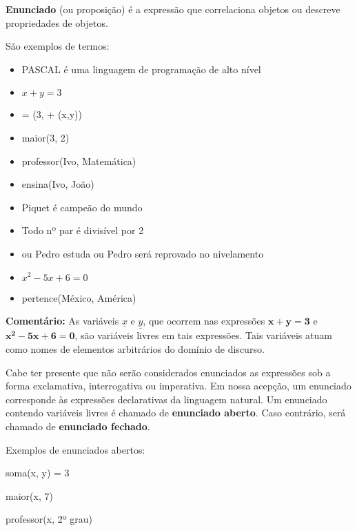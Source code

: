 \documentclass[
	14pt,				%
	twoside,			%
	a4paper,			%
	english,			%
	french,				%
	spanish,			%
	brazil,				%
    ]{abntex2}
\begin{document}
\vskip 0.5cm

\begin{addmargin}[2.0cm]{0cm}
\textbf{Enunciado} (ou proposição) é a expressão que correlaciona objetos ou descreve propriedades de objetos.
\end{addmargin}

\vskip 0.5cm

\noindent São exemplos de termos:

\begin{itemize}[itemsep=0.01pt]
\renewcommand\labelitemi{\textbf{-}}
    \item PASCAL é uma linguagem de programação de alto nível
    \item $x + y = 3$
    \item  = (3, + (x,y))
    \item  maior(3, 2)
    \item professor(Ivo, Matemática)
    \item ensina(Ivo, João)
    \item Piquet é campeão do mundo
    \item Todo nº par é divisível por 2
    \item ou Pedro estuda ou Pedro será reprovado no nivelamento
    \item $x^2 - 5x + 6 = 0$
    \item pertence(México, América)
\end{itemize}

\textbf{Comentário:} As variáveis $\underline{x}$ e $\underline{y}$, que ocorrem nas expressões $\bm{x + y = 3}$ e $\bm{x^2 - 5x + 6 = 0}$, são variáveis livres em tais expressões.
Tais variáveis atuam como nomes de elementos arbitrários do domínio de discurso.

\noindent
Cabe ter presente que não serão considerados enunciados as expressões sob a forma exclamativa, interrogativa ou imperativa.
Em nossa acepção, um enunciado corresponde às expressões declarativas da linguagem natural.
Um enunciado contendo variáveis livres é chamado de \textbf{enunciado aberto}.
Caso contrário, será chamado de \textbf{enunciado fechado}.

\bigskip

\noindent
Exemplos de enunciados abertos:

\hskip 2.5cm soma(x, y) = 3

\hskip 2.5cm maior(x, 7)

\hskip 2.5cm professor(x, 2º grau)

\bigskip
\end{document}
